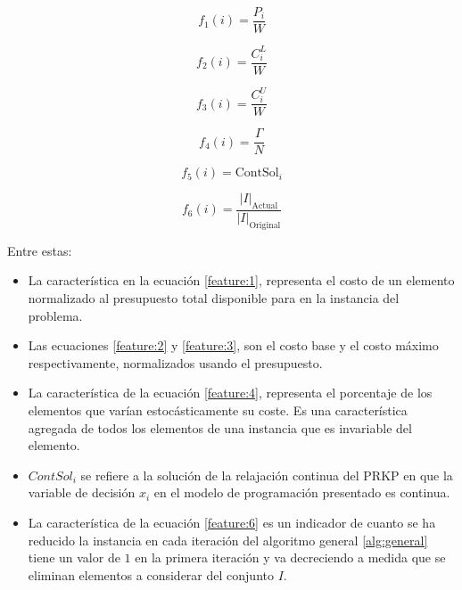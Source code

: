 \documentclass[spanish, a4paper, 12pt, openany,final]{book}
\begin{document}
\begin{multicols}{2}
	\label{eq:all_features}
	\begin{equation}
		f_1\left(i\right)   = \frac{P_i}{W}
		\label{feature:1}
	\end{equation}
	
	\begin{equation}
		f_2\left(i\right)   = \frac{C^L_i}{W}
		\label{feature:2}
	\end{equation}
	
	\begin{equation}
		f_3\left(i\right)   = \frac{C^U_i}{W}
		\label{feature:3}
	\end{equation}
	
	\begin{equation}
		f_4\left(i\right)   = \frac{\Gamma}{N}
		\label{feature:4}
	\end{equation}
	
	\begin{equation}
		f_5\left(i\right)   = \text{ContSol}_i
		\label{feature:5}
	\end{equation}
	
\begin{equation}
	\label{feature:6}
	f_6(i) = \frac{|I|_{\text{Actual}}}{|I|_\text{Original}}
\end{equation}	
\end{multicols}






Entre estas:
\begin{itemize}
	\item La característica en la ecuación \eqref{feature:1}, representa el costo de un elemento normalizado al presupuesto total disponible para en la instancia del problema.
	\item Las ecuaciones \eqref{feature:2} y \eqref{feature:3}, son el costo base y el costo máximo respectivamente, normalizados usando el presupuesto.
	\item La característica de la ecuación \eqref{feature:4}, representa el porcentaje de los elementos que varían estocásticamente su coste. Es una característica agregada de todos los elementos de una instancia que es invariable del elemento.
	
	\item $ContSol_i$ se refiere a la solución de la relajación continua del PRKP en que la variable de decisión $x_i$ en el modelo de programación presentado es continua.
	
	\item La característica de la ecuación \eqref{feature:6} es un indicador de cuanto se ha reducido la instancia en cada iteración del algoritmo general \ref{alg:general} tiene un valor de $1$ en la primera iteración y va decreciendo a medida que se eliminan elementos a considerar del conjunto $I$.
	
\end{itemize}
\end{document}
